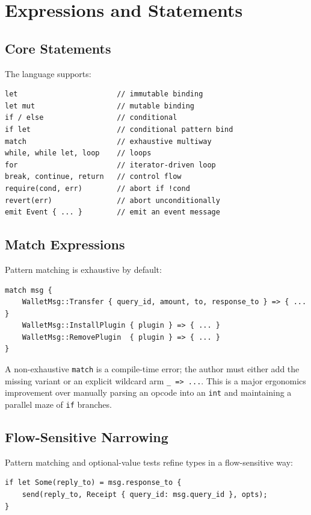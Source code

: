 \documentclass[12pt,oneside]{article}
\begin{document}
\section{Expressions and Statements}
\subsection{Core Statements}
The language supports:

\begin{verbatim}
let                       // immutable binding
let mut                   // mutable binding
if / else                 // conditional
if let                    // conditional pattern bind
match                     // exhaustive multiway
while, while let, loop    // loops
for                       // iterator-driven loop
break, continue, return   // control flow
require(cond, err)        // abort if !cond
revert(err)               // abort unconditionally
emit Event { ... }        // emit an event message
\end{verbatim}

\subsection{Match Expressions}
Pattern matching is exhaustive by default:

\begin{verbatim}
match msg {
    WalletMsg::Transfer { query_id, amount, to, response_to } => { ... }
    WalletMsg::InstallPlugin { plugin } => { ... }
    WalletMsg::RemovePlugin  { plugin } => { ... }
}
\end{verbatim}

A non-exhaustive \verb|match| is a compile-time error; the author must
either add the missing variant or an explicit wildcard arm \verb|_ => ...|.
This is a major ergonomics improvement over manually parsing an opcode
into an \verb|int| and maintaining a parallel maze of \verb|if|
branches.

\subsection{Flow-Sensitive Narrowing}
Pattern matching and optional-value tests refine types in a
flow-sensitive way:

\begin{verbatim}
if let Some(reply_to) = msg.response_to {
    send(reply_to, Receipt { query_id: msg.query_id }, opts);
}
\end{verbatim}
\end{document}
